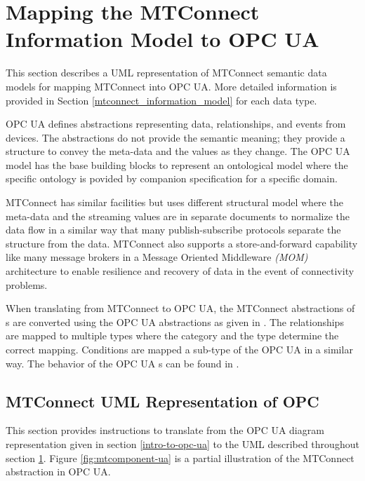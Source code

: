 \clearpage
\section{Mapping the MTConnect Information Model to OPC UA} 
\label{mtconnect-mapping}

This section describes a UML representation of MTConnect semantic data models for mapping MTConnect into OPC UA. More detailed information is provided in Section \ref{mtconnect_information_model} for each data type.

OPC UA defines abstractions representing data, relationships, and events from devices. The abstractions do not provide the semantic meaning; they provide a structure to convey the meta-data and the values as they change. The OPC UA model has the base building blocks to represent an ontological model where the specific ontology is povided by companion specification for a specific domain.

MTConnect has similar facilities but uses different structural model where the meta-data and the streaming values are in separate documents to normalize the data flow in a similar way that many publish-subscribe protocols separate the structure from the data. MTConnect also supports a store-and-forward capability like many message brokers in a Message Oriented Middleware \textit{(MOM)} architecture to enable resilience and recovery of data in the event of connectivity problems.

When translating from MTConnect to OPC UA, the MTConnect abstractions of s are converted using the OPC UA   abstractions as given in \cite{UAPart8}.  The relationships are mapped to multiple  types where the category and the type determine the correct mapping. Conditions are mapped a sub-type of the OPC UA  in a similar way. The behavior of the OPC UA s can be found in \cite{UAPart9}.

\subsection{MTConnect UML Representation of OPC}

This section provides instructions to translate from the OPC UA diagram representation given in section \ref{intro-to-opc-ua} to the UML described throughout section \ref{mtconnect-mapping}. Figure \ref{fig:mtcomponent-ua} is a partial illustration of the MTConnect  abstraction in OPC UA.

